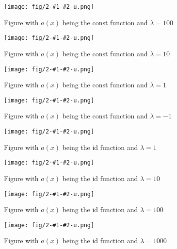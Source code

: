 \documentclass[a4paper,11pt]{article}
\begin{document}



\newcommand{\genfig}[2]{
    \centering
    \begin{figure}
      \texttt{[image: fig/2-\#1-\#2-u.png]}
      \caption{Figure with \ensuremath{a(x)} being the #1 function and
    \ensuremath{\lambda = #2}}
      \label{fig:#1-#2}
    \end{figure}
}


\genfig{const}{100}
\genfig{const}{10}
\genfig{const}{1}
\genfig{const}{-1}
\genfig{id}{1}
\genfig{id}{10}
\genfig{id}{100}
\genfig{id}{1000}










\end{document}

